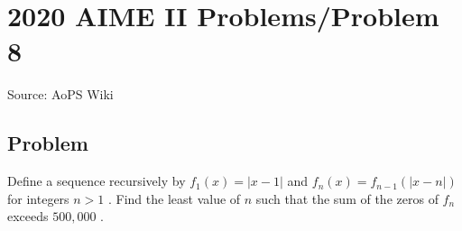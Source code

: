 \documentclass[12pt]{article}
\begin{document}
\section*{{2020 AIME II Problems/Problem 8}}
Source: AoPS Wiki

\subsection*{Problem}
Define a sequence recursively by $f_1(x)=|x-1|$ and $f_n(x)=f_{n-1}(|x-n|)$ for integers $n>1$ . Find the least value of $n$ such that the sum of the zeros of $f_n$ exceeds $500,000$ .
\end{document}
